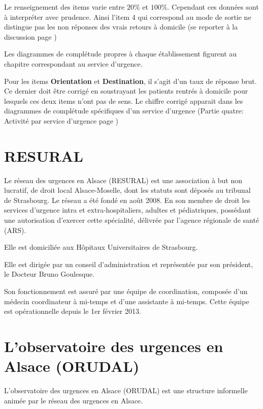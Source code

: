 \documentclass[12pt,english,french,twoside]{book}\usepackage[]{graphicx}\usepackage[]{color}
\begin{document}
Le renseignement des items varie entre $20\%$ et $100\%$. Cependant ces données sont à interpréter avec prudence. Ainsi l'item 4 qui correspond au mode de sortie ne distingue pas les non réponses des vrais retours à domicile (se reporter à la discussion page \pageref{ref:sortie})

Les diagrammes de complétude propres à chaque établissement figurent au chapitre correspondant au service d'urgence.

Pour les items \textbf{Orientation} et \textbf{Destination}, il s'agit d'un taux de réponse brut. Ce dernier doit être corrigé en soustrayant les patients rentrés à domicile pour lesquels ces deux items n'ont pas de sens. Le chiffre corrigé apparait dans les diagrammes de complétude spécifiques d'un service d'urgence (Partie quatre: Activité par service d'urgence page \pageref{partie4})


\newpage
\chapter{RESURAL}


Le réseau des urgences en Alsace (RESURAL) est une association à but non lucratif, de droit local Alsace-Moselle, dont les statuts sont déposés au tribunal de Strasbourg. Le réseau a été fondé en août 2008. En son membre de droit les services d'urgence intra et extra-hospitaliers, adultes et pédiatriques, possédant une autorisation d'exercer cette spécialité, délivrée par l'agence régionale de santé (ARS). 

Elle est domiciliée aux Hôpitaux Universitaires de Strasbourg.

Elle est dirigée par un conseil d'administration et représentée par son président, le Docteur Bruno Goulesque.

Son fonctionnement est assuré par une équipe de coordination, composée d'un médecin coordinateur à mi-temps et d'une assistante à mi-temps. Cette équipe est opérationnelle depuis le 1er février 2013.


\newpage
\chapter{L'observatoire des urgences en Alsace (ORUDAL)}


L'observatoire des urgences en Alsace (ORUDAL) est une structure informelle animée par le réseau des urgences en Alsace.
\end{document}
